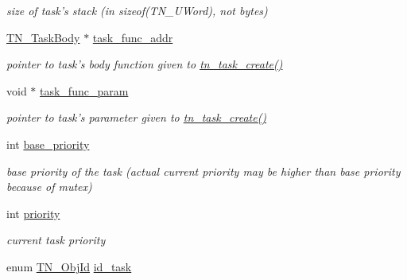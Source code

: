 \begin{DoxyCompactItemize}
\begin{DoxyCompactList}\small\item\em size of task's stack (in {\ttfamily sizeof(\+T\+N\+\_\+\+U\+Word)}, not bytes) \end{DoxyCompactList}\item 
\hypertarget{structTN__Task_a69c06e09b4d2a8a258f0733b58324139}{\hyperlink{tn__common_8h_a82f7de9034cbbb373c4dbcff45942343}{T\+N\+\_\+\+Task\+Body} $\ast$ \hyperlink{structTN__Task_a69c06e09b4d2a8a258f0733b58324139}{task\+\_\+func\+\_\+addr}}\label{structTN__Task_a69c06e09b4d2a8a258f0733b58324139}

\begin{DoxyCompactList}\small\item\em pointer to task's body function given to {\ttfamily \hyperlink{tn__tasks_8h_a548d5adda09d1b4e393b5df0e9e1a7a5}{tn\+\_\+task\+\_\+create()}} \end{DoxyCompactList}\item 
\hypertarget{structTN__Task_a55c62af79c5b4fdc2f1b414d409afe73}{void $\ast$ \hyperlink{structTN__Task_a55c62af79c5b4fdc2f1b414d409afe73}{task\+\_\+func\+\_\+param}}\label{structTN__Task_a55c62af79c5b4fdc2f1b414d409afe73}

\begin{DoxyCompactList}\small\item\em pointer to task's parameter given to {\ttfamily \hyperlink{tn__tasks_8h_a548d5adda09d1b4e393b5df0e9e1a7a5}{tn\+\_\+task\+\_\+create()}} \end{DoxyCompactList}\item 
\hypertarget{structTN__Task_a7775b785b3f0b57918e9a0c88491a069}{int \hyperlink{structTN__Task_a7775b785b3f0b57918e9a0c88491a069}{base\+\_\+priority}}\label{structTN__Task_a7775b785b3f0b57918e9a0c88491a069}

\begin{DoxyCompactList}\small\item\em base priority of the task (actual current priority may be higher than base priority because of mutex) \end{DoxyCompactList}\item 
\hypertarget{structTN__Task_a43c9c73249da8faa1177587786c40616}{int \hyperlink{structTN__Task_a43c9c73249da8faa1177587786c40616}{priority}}\label{structTN__Task_a43c9c73249da8faa1177587786c40616}

\begin{DoxyCompactList}\small\item\em current task priority \end{DoxyCompactList}\item 
\hypertarget{structTN__Task_a014a0a70ae6a23d08b1571ac6b017abd}{enum \hyperlink{tn__common_8h_ae779dd1f6735f6e139fb70acd004d976}{T\+N\+\_\+\+Obj\+Id} \hyperlink{structTN__Task_a014a0a70ae6a23d08b1571ac6b017abd}{id\+\_\+task}}\label{structTN__Task_a014a0a70ae6a23d08b1571ac6b017abd}


\end{DoxyCompactItemize}
